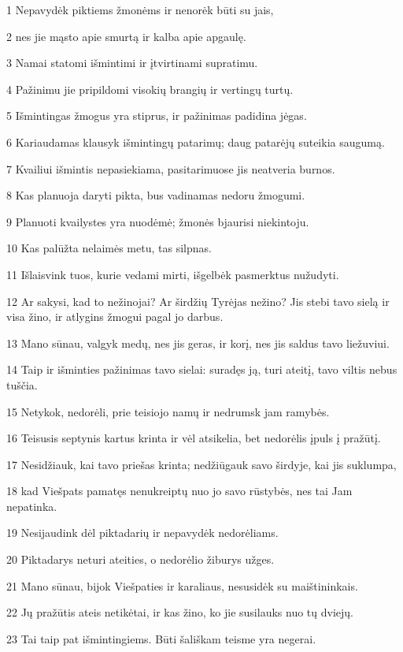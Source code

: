 \par 1 Nepavydėk piktiems žmonėms ir nenorėk būti su jais, 
\par 2 nes jie mąsto apie smurtą ir kalba apie apgaulę. 
\par 3 Namai statomi išmintimi ir įtvirtinami supratimu. 
\par 4 Pažinimu jie pripildomi visokių brangių ir vertingų turtų. 
\par 5 Išmintingas žmogus yra stiprus, ir pažinimas padidina jėgas. 
\par 6 Kariaudamas klausyk išmintingų patarimų; daug patarėjų suteikia saugumą. 
\par 7 Kvailiui išmintis nepasiekiama, pasitarimuose jis neatveria burnos. 
\par 8 Kas planuoja daryti pikta, bus vadinamas nedoru žmogumi. 
\par 9 Planuoti kvailystes yra nuodėmė; žmonės bjaurisi niekintoju. 
\par 10 Kas palūžta nelaimės metu, tas silpnas. 
\par 11 Išlaisvink tuos, kurie vedami mirti, išgelbėk pasmerktus nužudyti. 
\par 12 Ar sakysi, kad to nežinojai? Ar širdžių Tyrėjas nežino? Jis stebi tavo sielą ir visa žino, ir atlygins žmogui pagal jo darbus. 
\par 13 Mano sūnau, valgyk medų, nes jis geras, ir korį, nes jis saldus tavo liežuviui. 
\par 14 Taip ir išminties pažinimas tavo sielai: suradęs ją, turi ateitį, tavo viltis nebus tuščia. 
\par 15 Netykok, nedorėli, prie teisiojo namų ir nedrumsk jam ramybės. 
\par 16 Teisusis septynis kartus krinta ir vėl atsikelia, bet nedorėlis įpuls į pražūtį. 
\par 17 Nesidžiauk, kai tavo priešas krinta; nedžiūgauk savo širdyje, kai jis suklumpa, 
\par 18 kad Viešpats pamatęs nenukreiptų nuo jo savo rūstybės, nes tai Jam nepatinka. 
\par 19 Nesijaudink dėl piktadarių ir nepavydėk nedorėliams. 
\par 20 Piktadarys neturi ateities, o nedorėlio žiburys užges. 
\par 21 Mano sūnau, bijok Viešpaties ir karaliaus, nesusidėk su maištininkais. 
\par 22 Jų pražūtis ateis netikėtai, ir kas žino, ko jie susilauks nuo tų dviejų. 
\par 23 Tai taip pat išmintingiems. Būti šališkam teisme yra negerai. 

